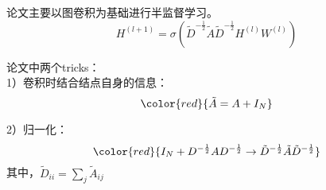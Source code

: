 
论文主要以图卷积为基础进行半监督学习。
$$
H^{(l+1)} = \sigma(\tilde{D}^{-\frac{1}{2}} \tilde{A} \tilde{D}^{-\frac{1}{2}} H^{(l)} W^{(l)} )
$$

论文中两个tricks：\\
1）卷积时结合结点自身的信息：
$$
{\color{red}{\tilde{A} = A + I_N}}
$$

2）归一化：
$$
{\color{red} { I_N + D^{-\frac{1}{2}}AD^{-\frac{1}{2}}  \to \tilde{D}^{-\frac{1}{2}} \tilde{A} \tilde{D}^{-\frac{1}{2}} } }  
$$
其中，$\tilde{D}_{ii} = \sum_j \tilde{A}_{ij}$


